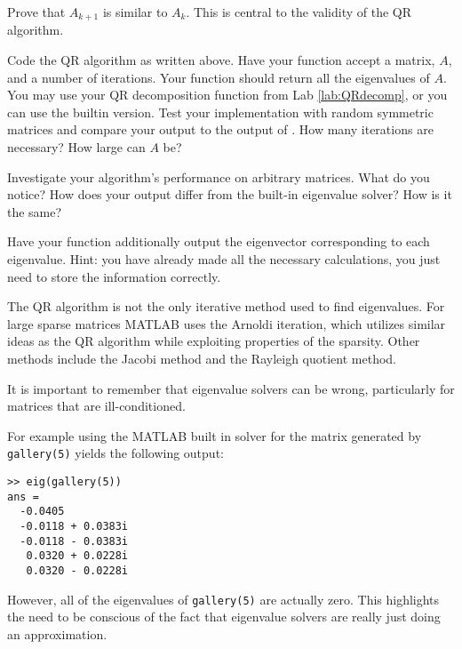 \begin{problem}
Prove that $A_{k+1}$ is similar to $A_k$. This is central to the validity of the QR algorithm.
\end{problem}

\begin{problem}
Code the QR algorithm as written above. Have your function accept a matrix, $A$, and a number of iterations. Your function should return all the eigenvalues of $A$. You may use your QR decomposition function from Lab \ref{lab:QRdecomp}, or you can use the builtin version. Test your implementation with random symmetric matrices and compare your output to the output of . How many iterations are necessary? How large can $A$ be?
\end{problem}

\begin{problem}
Investigate your algorithm's performance on arbitrary matrices. What do you notice? How does your output differ from the built-in eigenvalue solver? How is it the same?
\end{problem}

\begin{problem}
Have your function additionally output the eigenvector corresponding to each eigenvalue. Hint: you have already made all the necessary calculations, you just need to store the information correctly.
\end{problem}

The QR algorithm is not the only iterative method used to find eigenvalues. For large sparse matrices MATLAB uses the Arnoldi iteration, which utilizes similar ideas as the QR algorithm while exploiting properties of the sparsity. Other methods include the Jacobi method and the Rayleigh quotient method.

It is important to remember that eigenvalue solvers can be wrong, particularly for matrices that are ill-conditioned. 
\begin{matlab}
For example using the MATLAB built in solver for the matrix generated by {\tt gallery(5)} yields the following output:
\begin{lstlisting}[style=matlab]
>> eig(gallery(5))
ans =
  -0.0405          
  -0.0118 + 0.0383i
  -0.0118 - 0.0383i
   0.0320 + 0.0228i
   0.0320 - 0.0228i
\end{lstlisting}

However, all of the eigenvalues of {\tt gallery(5)} are actually zero. This highlights the need to be conscious of the fact that eigenvalue solvers are really just doing an approximation.
\end{matlab}
